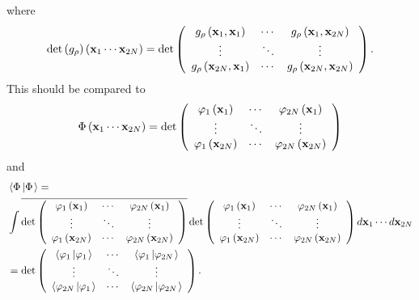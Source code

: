 \documentclass[aps,preprint]{revtex4}%
\begin{document}
where%
\begin{equation}
\det\left(  g_{\rho}\right)  \left(  \mathbf{x}_{1}\cdots\mathbf{x}%
_{2N}\right)  =\det\left(
\begin{array}
[c]{ccc}%
g_{\rho}\left(  \mathbf{x}_{1},\mathbf{x}_{1}\right)  & \cdots & g_{\rho
}\left(  \mathbf{x}_{1},\mathbf{x}_{2N}\right) \\
\vdots & \ddots & \vdots\\
g_{\rho}\left(  \mathbf{x}_{2N},\mathbf{x}_{1}\right)  & \cdots & g_{\rho
}\left(  \mathbf{x}_{2N},\mathbf{x}_{2N}\right)
\end{array}
\right)  .
\end{equation}
This should be compared to
\begin{equation}
\Phi\left(  \mathbf{x}_{1}\cdots\mathbf{x}_{2N}\right)  =\det\left(
\begin{array}
[c]{ccc}%
\varphi_{1}\left(  \mathbf{x}_{1}\right)  & \cdots & \varphi_{2N}\left(
\mathbf{x}_{1}\right) \\
\vdots & \ddots & \vdots\\
\varphi_{1}\left(  \mathbf{x}_{2N}\right)  & \cdots & \varphi_{2N}\left(
\mathbf{x}_{2N}\right)
\end{array}
\right)
\end{equation}
and%
\begin{align}
&  \left\langle \Phi\left\vert \Phi\right.  \right\rangle =\\
&  \int\overline{\det\left(
\begin{array}
[c]{ccc}%
\varphi_{1}\left(  \mathbf{x}_{1}\right)  & \cdots & \varphi_{2N}\left(
\mathbf{x}_{1}\right) \\
\vdots & \ddots & \vdots\\
\varphi_{1}\left(  \mathbf{x}_{2N}\right)  & \cdots & \varphi_{2N}\left(
\mathbf{x}_{2N}\right)
\end{array}
\right)  }\det\left(
\begin{array}
[c]{ccc}%
\varphi_{1}\left(  \mathbf{x}_{1}\right)  & \cdots & \varphi_{2N}\left(
\mathbf{x}_{1}\right) \\
\vdots & \ddots & \vdots\\
\varphi_{1}\left(  \mathbf{x}_{2N}\right)  & \cdots & \varphi_{2N}\left(
\mathbf{x}_{2N}\right)
\end{array}
\right)  d\mathbf{x}_{1}\cdots d\mathbf{x}_{2N}\\
&  =\det\left(
\begin{array}
[c]{ccc}%
\left\langle \varphi_{1}\left\vert \varphi_{1}\right.  \right\rangle  & \cdots
& \left\langle \varphi_{1}\left\vert \varphi_{2N}\right.  \right\rangle \\
\vdots & \ddots & \vdots\\
\left\langle \varphi_{2N}\left\vert \varphi_{1}\right.  \right\rangle  &
\cdots & \left\langle \varphi_{2N}\left\vert \varphi_{2N}\right.
\right\rangle
\end{array}
\right)  .
\end{align}
\end{document}
